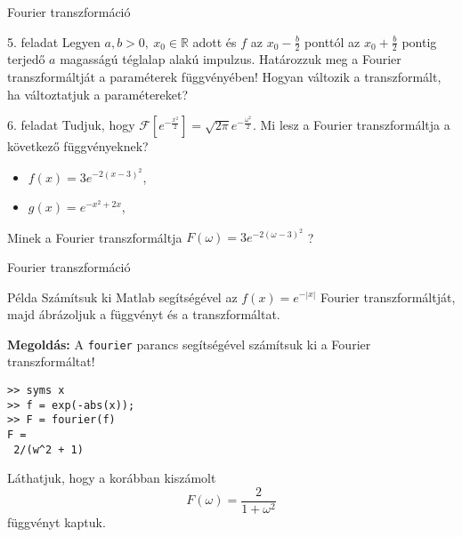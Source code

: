 \documentclass[table]{beamer}
\begin{document}








\begin{frame}[fragile]
{Fourier transzformáció}
\begin{exampleblock}{5. feladat}
Legyen $a,b>0,\ x_0\in\mathbb{R}$ adott és $f$ az $x_0-\tfrac{b}{2}$ ponttól az $x_0+\tfrac{b}{2}$ 
pontig terjedő $a$ magasságú téglalap alakú impulzus. Határozzuk meg a Fourier transzformáltját a 
paraméterek függvényében! Hogyan változik a transzformált, ha változtatjuk a paramétereket?
\end{exampleblock}
\begin{exampleblock}{6. feladat}
Tudjuk, hogy $\mathcal{F}\left[e^{-\frac{x^2}{2}}\right]=\sqrt{2\pi}e^{-\frac{\omega^2}{2}}$.
Mi lesz a Fourier transzformáltja a következő függvényeknek?
\begin{itemize}
\item $f(x)=3e^{-2(x-3)^2}$,
\item $g(x)=e^{-x^2+2x}$,
\end{itemize}
Minek a Fourier transzformáltja $F(\omega)=3e^{-2(\omega-3)^2}$ ?
\end{exampleblock}
\end{frame}
\begin{frame}[fragile]
{Fourier transzformáció}
\begin{exampleblock}{Példa}
Számítsuk ki Matlab segítségével az $f(x)=e^{-|x|}$ Fourier transzformáltját, majd ábrázoljuk a függvényt és a transzformáltat.
\end{exampleblock}
\textbf{Megoldás:}
A \texttt{fourier} parancs segítségével számítsuk ki a Fourier transzformáltat!
\begin{verbatim}
>> syms x
>> f = exp(-abs(x));
>> F = fourier(f)
F =
 2/(w^2 + 1)
\end{verbatim}

L\'athatjuk, hogy a kor\'abban kisz\'amolt 
\[
F(\omega)=\frac{2}{1+\omega ^2}
\]
f\"uggv\'enyt kaptuk. 
\end{frame}
\end{document}
